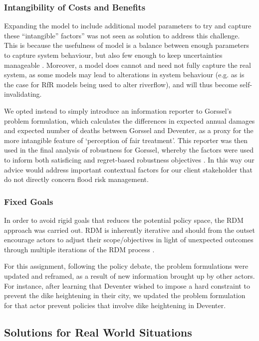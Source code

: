 \subsubsection{Intangibility of Costs and Benefits} Expanding the model to include additional model parameters to try and capture these “intangible” factors” was not seen as solution to address this challenge. This is because the usefulness of model is a balance between enough parameters to capture system behaviour, but also few enough to keep uncertainties manageable \parencite{saltelli_five_2020}. Moreover, a model does cannot and need not fully capture the real system, as some models may lead to alterations in system behaviour (e.g. as is the case for RfR models being used to alter riverflow), and will thus become self-invalidating.

We opted instead to simply introduce an information reporter to Gorssel’s problem formulation, which calculates the differences in expected annual damages and expected number of deaths between Gorssel and Deventer, as a proxy for the more intangible feature of ‘perception of fair treatment’. This reporter was then used in the final analysis of robustness for Gorssel, whereby the factors were used to inform both satisficing and regret-based robustness objectives \parencite{mcphail_robustness_2018}. In this way our advice would address important contextual factors for our client stakeholder that do not directly concern flood risk management. 

\subsubsection{Fixed Goals} In order to avoid rigid goals that reduces the potential policy space, the RDM approach was carried out. RDM is inherently iterative and should from the outset encourage actors to adjust their scope/objectives in light of unexpected outcomes through multiple iterations of the RDM process \parencite{lempert_general_2006}. 

For this assignment, following the policy debate, the problem formulations were updated and reframed, as a result of new information brought up by other actors. For instance, after learning that Deventer wished to impose a hard constraint to prevent the dike heightening in their city, we updated the problem formulation for that actor prevent policies that involve dike heightening in Deventer. 

\subsection{Solutions for Real World Situations }

